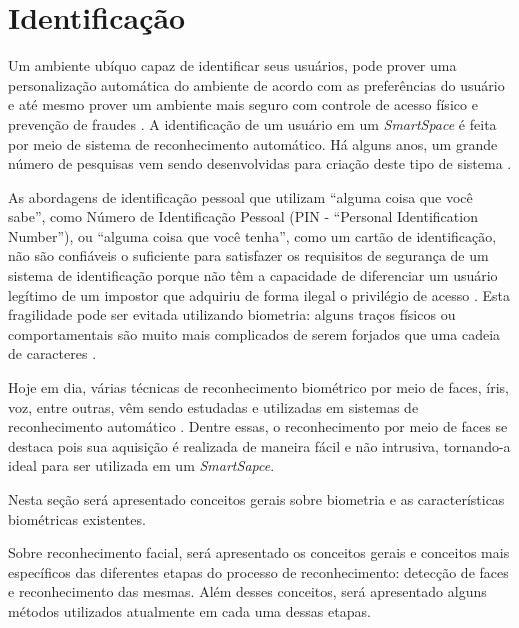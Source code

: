 	

\section{Identificação}

	Um ambiente ubíquo capaz de identificar seus usuários, pode prover uma personalização automática do ambiente de acordo com as preferências do usuário e até mesmo prover um ambiente mais seguro com controle de acesso físico e prevenção de fraudes \cite{saocarlos}. A identificação de um usuário em um \textit{SmartSpace} é feita por meio de sistema de reconhecimento automático. Há alguns anos, um grande número de pesquisas vem sendo desenvolvidas para criação deste tipo de sistema  \cite{saocarlos}. 

	As abordagens de identificação pessoal que utilizam ``alguma coisa que você sabe'', como Número de Identificação Pessoal (PIN - ``Personal Identification Number''), ou ``alguma coisa que você tenha'', como um cartão de identificação, não são confiáveis o suficiente para satisfazer os requisitos de segurança de um sistema de identificação porque não têm a capacidade de diferenciar um usuário legítimo de um impostor que adquiriu de forma ilegal o privilégio de acesso \cite{hong}. Esta fragilidade pode ser evitada utilizando biometria: alguns traços físicos ou comportamentais são muito mais complicados de serem forjados que uma cadeia de caracteres \cite{drovetto}. 

	Hoje em dia, várias técnicas de reconhecimento biométrico por meio de faces, íris, voz, entre outras, vêm sendo estudadas e utilizadas em sistemas de reconhecimento automático \cite{bolle}. Dentre essas, o reconhecimento por meio de faces se destaca pois sua aquisição é realizada de maneira fácil e não intrusiva, tornando-a ideal para ser utilizada em um \textit{SmartSapce}.

	Nesta seção será apresentado conceitos gerais sobre biometria e as características biométricas existentes.

	Sobre reconhecimento facial, será apresentado os conceitos gerais e conceitos mais específicos das diferentes etapas do processo de reconhecimento: detecção de faces e reconhecimento das mesmas. Além desses conceitos, será apresentado alguns métodos utilizados atualmente em cada uma dessas etapas.


	
	





























